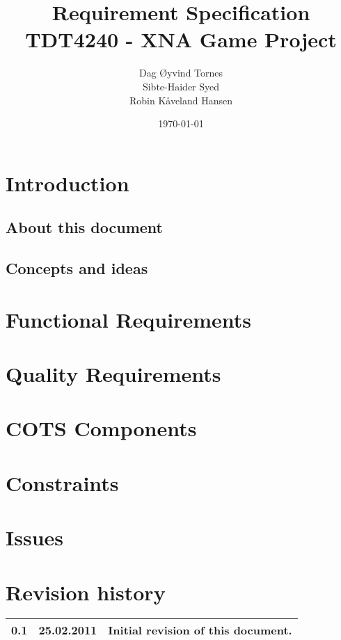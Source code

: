 \documentclass[titlepage,a4paper,11pt]{article}
\date{\today}
\begin{document}
\title{Requirement Specification\\
 		TDT4240 - XNA Game Project}

\author{Dag Øyvind Tornes\\
 		Sibte-Haider Syed\\ 
		Robin Kåveland Hansen\\}
\maketitle

\pagestyle{empty}
\tableofcontents
\clearpage
\pagestyle{plain}

\section{Introduction}
	\subsection{About this document}
		

\subsection{Concepts and ideas}
	\label{concepts}
	

\section{Functional Requirements}
	\label{funcreq}
	

\section{Quality Requirements}
	\label{qualreq}
	

\section{COTS Components}
	\label{components}
	

\section{Constraints}
	\label{constraints}
	

\section{Issues}
	\label{issues}
	

\printbibliography


\section{Revision history}

\begin{table}[H]
  \begin{tabular}{| c | c | c |}
    \hline
    0.1 & 25.02.2011 & Initial revision of this document. \\
    \hline
  \end{tabular}
\end{table}
\end{document}

